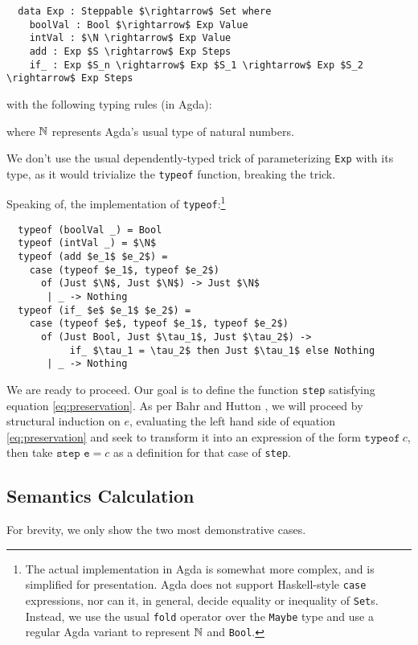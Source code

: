 \documentclass[manuscript,screen,review,sigplan]{acmart}
\begin{document}
\begin{lstlisting}
  data Exp : Steppable $\rightarrow$ Set where
    boolVal : Bool $\rightarrow$ Exp Value
    intVal : $\N \rightarrow$ Exp Value
    add : Exp $S \rightarrow$ Exp Steps
    if_ : Exp $S_n \rightarrow$ Exp $S_1 \rightarrow$ Exp $S_2 \rightarrow$ Exp Steps
\end{lstlisting}

with the following typing rules (in Agda):

where $\mathbb{N}$ represents Agda's usual type of natural numbers.

We don't use the usual dependently-typed trick of parameterizing
\texttt{Exp} with its type, as it would trivialize the \texttt{typeof}
function, breaking the trick.

Speaking of, the implementation of \texttt{typeof}:\footnote{The actual
implementation in Agda is somewhat more complex, and is simplified for
presentation. Agda does not support Haskell-style \texttt{case} expressions,
nor can it, in general, decide equality or inequality of \texttt{Set}s.
Instead, we use the usual \texttt{fold} operator over the \texttt{Maybe}
type and use a regular Agda variant to represent $\mathbb{N}$ and \texttt{Bool}.}

\begin{lstlisting}
  typeof (boolVal _) = Bool
  typeof (intVal _) = $\N$
  typeof (add $e_1$ $e_2$) =
    case (typeof $e_1$, typeof $e_2$)
      of (Just $\N$, Just $\N$) -> Just $\N$
       | _ -> Nothing
  typeof (if_ $e$ $e_1$ $e_2$) =
    case (typeof $e$, typeof $e_1$, typeof $e_2$)
      of (Just Bool, Just $\tau_1$, Just $\tau_2$) ->
           if_ $\tau_1 = \tau_2$ then Just $\tau_1$ else Nothing
       | _ -> Nothing
\end{lstlisting}

We are ready to proceed. Our goal is to define the function \texttt{step}
satisfying equation \ref{eq:preservation}. As per Bahr and Hutton
\cite{bahr:2015}, we will proceed by structural induction on $e$, evaluating
the left hand side of equation \ref{eq:preservation} and seek to transform it
into an expression of the form $\texttt{typeof}\ c$, then take $\texttt{step e}
= c$ as a definition for that case of \texttt{step}.

\subsection{Semantics Calculation}

For brevity, we only show the two most demonstrative cases.
\end{document}
